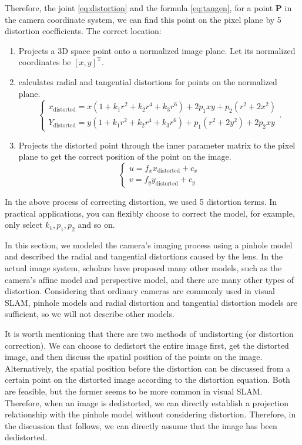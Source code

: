 Therefore, the joint \eqref{eq:distortion} and the formula \eqref{eq:tangen}, for a point $\bm{P}$ in the camera coordinate system, we can find this point on the pixel plane by 5 distortion coefficients. The correct location:

\begin{enumerate}
	\item Projects a 3D space point onto a normalized image plane. Let its normalized coordinates be $[x,y]^\mathrm{T}$.
	
	\item calculates radial and tangential distortions for points on the normalized plane.
	\begin{equation}
	\left\{\begin{matrix} x_\mathrm{distorted} =x(1+k_1r^2+k_2r^4+k_3r^6)+2p_1xy+p_2(r^2+2x^2)\\ 
	Y_\mathrm{distorted} = y(1+k_1r^2+k_2r^4+k_3r^6)+p_1(r^2+2y^2)+2p_2xy
	\end{matrix}\right. .
	\end{equation}
	\item Projects the distorted point through the inner parameter matrix to the pixel plane to get the correct position of the point on the image.
	\begin{equation}
	\left\{\begin{matrix} u=f_x x_\mathrm{distorted} + c_x\\ v=f_y y_\mathrm{distorted} + c_y\end{matrix}\right.
	\end{equation}
\end{enumerate}

In the above process of correcting distortion, we used 5 distortion terms. In practical applications, you can flexibly choose to correct the model, for example, only select $k_1, p_1, p_2$ and so on.

In this section, we modeled the camera's imaging process using a pinhole model and described the radial and tangential distortions caused by the lens. In the actual image system, scholars have proposed many other models, such as the camera's affine model and perspective model, and there are many other types of distortion. Considering that ordinary cameras are commonly used in visual SLAM, pinhole models and radial distortion and tangential distortion models are sufficient, so we will not describe other models.

It is worth mentioning that there are two methods of undistorting (or distortion correction). We can choose to dedistort the entire image first, get the distorted image, and then discuss the spatial position of the points on the image. Alternatively, the spatial position before the distortion can be discussed from a certain point on the distorted image according to the distortion equation. Both are feasible, but the former seems to be more common in visual SLAM. Therefore, when an image is dedistorted, we can directly establish a projection relationship with the pinhole model without considering distortion. Therefore, in the discussion that follows, we can directly assume that the image has been dedistorted.

